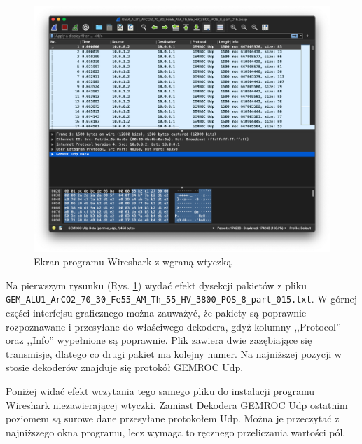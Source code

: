 \documentclass[a4paper, 12pt, twoside, openright]{article}
\begin{document}
	\begin{figure}[H]
		\centering
			\includegraphics[width=1.0\textwidth]{img/screenshot_dissector.png}
		\caption{Ekran programu Wireshark z wgraną wtyczką}
		\label{fig:dis}
	\end{figure}

Na pierwszym rysunku (Rys. \ref{fig:dis}) wydać efekt dysekcji pakietów z pliku \texttt{GEM\_ALU1\_ArCO2\_70\_30\_Fe55\_AM\_Th\_55\_HV\_3800\_POS\_8\_part\_015.txt}.
W górnej części interfejsu graficznego można zauważyć, że pakiety są poprawnie rozpoznawane i przesyłane do właściwego dekodera, gdyż
kolumny ,,Protocol'' oraz ,,Info'' wypełnione są poprawnie. Plik zawiera dwie zazębiające się transmisje, dlatego co drugi pakiet ma kolejny numer.
Na najniższej pozycji w stosie dekoderów znajduje się protokół GEMROC Udp.

Poniżej widać efekt wczytania tego samego pliku do instalacji programu Wireshark niezawierającej wtyczki. Zamiast Dekodera GEMROC Udp ostatnim poziomem
są surowe dane przesyłane protokołem Udp. Można je przeczytać z najniższego okna programu, lecz wymaga to ręcznego przeliczania wartości pól.
\end{document}
